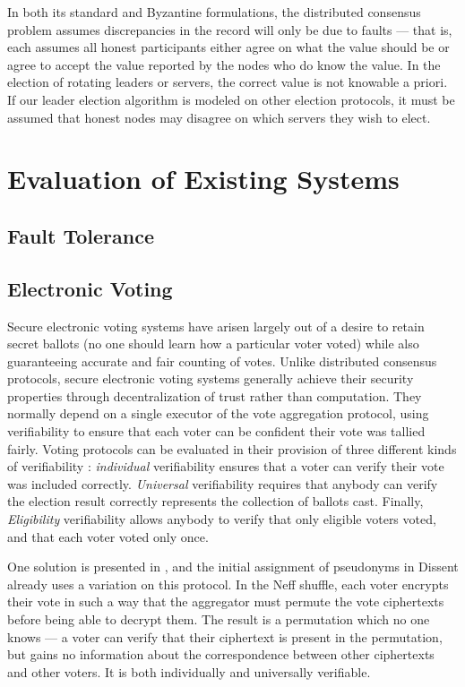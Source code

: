     In both its standard and Byzantine formulations, the distributed consensus
    problem assumes discrepancies in the record will only be due to faults ---
    that is, each assumes all honest participants either agree on what the value
    should be or agree to accept the value reported by the nodes who do know the
    value.  In the election of rotating leaders or servers, the correct value is
    not knowable a priori. If our leader election algorithm is modeled on other
    election protocols, it must be assumed that honest nodes may disagree on
    which servers they wish to elect.
\section{Evaluation of Existing Systems}
\subsection{Fault Tolerance}
\subsection{Electronic Voting} \label{Subsection:evoting}
    Secure electronic voting systems have arisen largely out of a desire to
    retain secret ballots (no one should learn how a particular voter voted)
    while also guaranteeing accurate and fair counting of votes. Unlike
    distributed consensus protocols, secure electronic voting systems generally
    achieve their security properties through decentralization of trust rather
    than computation. They normally depend on a single executor of the vote
    aggregation protocol, using verifiability to ensure that each voter can be
    confident their vote was tallied fairly. Voting protocols can be evaluated
    in their provision of three different kinds of verifiability
    \cite{kremer_election_2010}: \emph{individual} verifiability ensures that a
    voter can verify their vote was included correctly. \emph{Universal}
    verifiability requires that anybody can verify the election result correctly
    represents the collection of ballots cast. Finally, \emph{Eligibility}
    verifiability allows anybody to verify that only eligible voters voted, and
    that each voter voted only once.

    One solution is presented in \cite{neff_verifiable_2001},
    and the initial assignment of pseudonyms in Dissent already uses a variation
    on this protocol. In the Neff shuffle, each voter encrypts their vote in
    such a way that the aggregator must permute the vote ciphertexts before
    being able to decrypt them. The result is a permutation which no one knows
    --- a voter can verify that their ciphertext is present in the permutation,
    but gains no information about the correspondence between other ciphertexts
    and other voters. It is both individually and universally verifiable.

